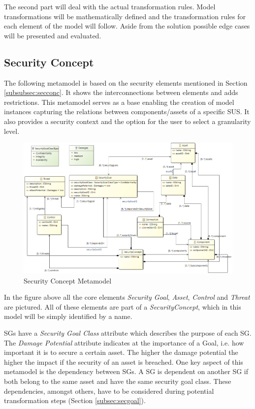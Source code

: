 The second part will deal with the actual transformation rules. Model transformations will be mathematically defined and the transformation rules for each element of the model will follow. Aside from the solution possible edge cases will be presented and evaluated.

\label{sec:approach}
\subsection{Security Concept}
\label{subsec:sec_concept}
The following metamodel is based on the security elements mentioned in Section \ref{subsubsec:secconc}. It shows the interconnections between elements and adds restrictions. This metamodel serves as a base enabling the creation of model instances capturing the relations between components/assets of a specific SUS. It also provides a security context and the option for the user to select a granularity level. 

\begin{figure}[H]
\centering
\includegraphics[width=1.2\textwidth]{pictures/concept_metamodel.png}
\caption{Security Concept Metamodel}
\label{fig:concept_metamodel}
\end{figure}

In the figure above all the core elements \textit{Security Goal}, \textit{Asset}, \textit{Control} and \textit{Threat} are pictured. All of these elements are part of a \textit{SecurityConcept}, which in this model will be simply identified by a name. 

SGs have a \textit{Security Goal Class} attribute which describes the purpose of each SG. The \textit{Damage Potential} attribute indicates at the importance of a Goal, i.e. how important it is to secure a certain asset. The higher the damage potential the higher the impact if the security of an asset is breached. One key aspect of this metamodel is the dependency between SGs. A SG is dependent on another SG if both belong to the same asset and have the same security goal class. These dependencies, amongst others, have to be considered during potential transformation steps (Section \ref{subsec:secgoal}). 

